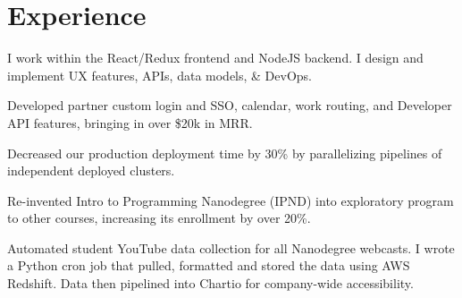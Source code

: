 \documentclass[]{deedy-resume-openfont}
\begin{document}
\begin{minipage}[t]{0.66\textwidth}


\section{Experience}

\vspace{\topsep} %
\begin{tightemize}

\item I work within the React/Redux frontend and NodeJS backend. I design and implement UX features, APIs, data models, \& DevOps.
\item Developed partner custom login and SSO, calendar, work routing, and Developer API features, bringing in over \$20k in MRR.
\item Decreased our production deployment time by 30\% by parallelizing pipelines of independent deployed clusters.

\end{tightemize}
\sectionsep

\begin{tightemize}

\item Re-invented Intro to Programming Nanodegree (IPND) into exploratory program to other courses, increasing its enrollment by over 20\%.


\item Automated student YouTube data collection for all Nanodegree webcasts. I wrote a Python cron job that pulled, formatted and stored the data using AWS Redshift. Data then pipelined into Chartio for company-wide accessibility.
\end{tightemize}
\sectionsep


\end{minipage}
\end{document}

